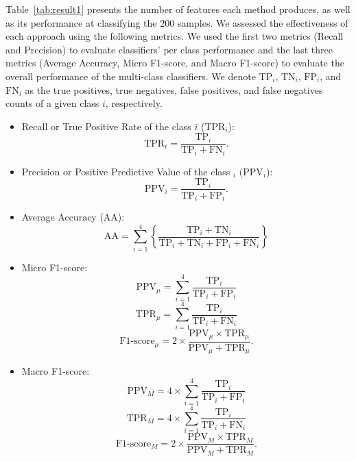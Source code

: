 \documentclass[journal]{IEEEtran}
\begin{document}
Table~\ref{tab:result1} presents the number of features each method produces, as well as its performance at classifying the $200$ samples.
We assessed the effectiveness of each approach using the following metrics. We used the first two metrics (Recall and Precision) to evaluate classifiers' per class performance and the last three metrics (Average Accuracy, Micro F1-score, and Macro F1-score) to evaluate the overall performance of the multi-class classifiers. We denote $\text{TP}_i$, $\text{TN}_i$, $\text{FP}_i$, and $\text{FN}_i$ as the true positives, true negatives, false positives, and false negatives counts of a given class $i$, respectively.
\begin{itemize}
	\item Recall or True Positive Rate of the class $i$ (TPR$_i$): 
	\begin{equation*}
	\text{TPR$_i$} = \frac{\text{TP}_i}{\text{TP}_i + \text{FN}_i}.
	\end{equation*}
	\item Precision or Positive Predictive Value of the class $_i$ (PPV$_i$): \begin{equation*}
	\text{PPV$_i$} = \frac{\text{TP}_i}{\text{TP}_i + \text{FP}_i}.
	\end{equation*}
	\item Average Accuracy (AA): 
	\begin{equation*}
	\text{AA} = \sum^{\text{4}}_{i = 1}\left\{\frac{\text{TP}_i + \text{TN}_i}{\text{TP}_i + \text{TN}_i + \text{FP}_i + \text{FN}_i}\right\} 
	\end{equation*}
	\item Micro F1-score: 
	\begin{equation*}
	\text{PPV}_\mu = \sum^{\text{4}}_{i = 1}\frac{\text{TP}_i}{\text{TP}_i + \text{FP}_i}
	\end{equation*}
	\begin{equation*}
	\text{TPR}_\mu = \sum^{\text{4}}_{i = 1}\frac{\text{TP}_i}{\text{TP}_i + \text{FN}_i}
	\end{equation*}
	\begin{equation*}
	\text{F1-score}_\mu = 2 \times \frac{\text{PPV}_\mu \times \text{TPR}_\mu}{\text{PPV}_\mu + \text{TPR}_\mu}.
	\end{equation*}
	\item Macro F1-score: 
	\begin{equation*}
	\text{PPV}_M = 4 \times \sum^{\text{4}}_{i = 1}\frac{\text{TP}_i}{\text{TP}_i + \text{FP}_i}
	\end{equation*}
	\begin{equation*}
	\text{TPR}_M = 4 \times \sum^{\text{4}}_{i = 1}\frac{\text{TP}_i}{\text{TP}_i + \text{FN}_i}
	\end{equation*}
	\begin{equation*}
	\text{F1-score}_M = 2 \times \frac{\text{PPV}_M \times \text{TPR}_M}{\text{PPV}_M + \text{TPR}_M}.
	\end{equation*}
\end{itemize}
\end{document}
